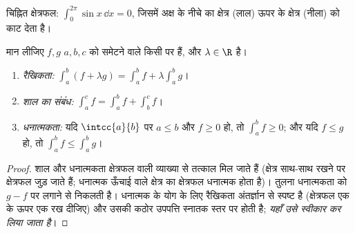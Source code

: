 \begin{omfigure}

{\small चिह्नित क्षेत्रफल: $\int_0^{2\pi} \sin x\,\dd x = 0$, जिसमें अक्ष के नीचे का क्षेत्र (लाल) ऊपर के
क्षेत्र (नीला) को काट देता है।}
\end{omfigure}

\begin{proposition}[समाकल के गुण]\label{prop:g12:integ:properties}
मान लीजिए $f, g$ $a, b, c$ को समेटने वाले किसी  पर  हैं, और $\lambda \in \R$ है।
\begin{enumerate}
  \item \emph{रैखिकता:} $\displaystyle\int_a^b (f + \lambda g) = \int_a^b f + \lambda \int_a^b g$।
  \item \emph{शाल का संबंध:} $\displaystyle\int_a^c f = \int_a^b f + \int_b^c f$।
  \item \emph{धनात्मकता:} यदि $\intcc{a}{b}$ पर $a \leq b$ और $f \geq 0$ हो, तो $\displaystyle\int_a^b f \geq 0$; और यदि $f \leq g$
        हो, तो $\displaystyle\int_a^b f \leq \int_a^b g$।
\end{enumerate}
\end{proposition}

\begin{proof}
शाल और धनात्मकता क्षेत्रफल वाली व्याख्या से तत्काल मिल जाते हैं (क्षेत्र
साथ-साथ रखने पर क्षेत्रफल जुड़ जाते हैं; धनात्मक ऊँचाई वाले क्षेत्र का
क्षेत्रफल धनात्मक होता है)। तुलना धनात्मकता को $g - f$ पर लगाने से निकलती है।
धनात्मक  के योग के लिए रैखिकता अंतर्ज्ञान से स्पष्ट है (क्षेत्रफल एक के
ऊपर एक रख दीजिए) और उसकी कठोर उपपत्ति स्नातक स्तर पर होती है; \emph{यहाँ उसे
स्वीकार कर लिया जाता है}।
\end{proof}

